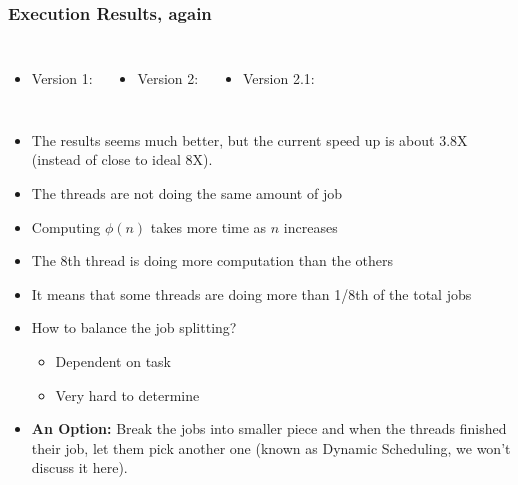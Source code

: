 \documentclass[aspectratio=43,11pt]{beamer}
\begin{document}
\begin{frame}
  \frametitle{Execution Results, again}

  \begin{columns}
  \begin{itemize}
    \item Version 1: \\
    \fontsize{8pt}{7.2}\selectfont{\tt real 0m38.191s \\
         user 0m38.180s \\
         sys  0m0.002s}  
  \end{itemize}
  \begin{itemize}
    \item Version 2: \\
    \fontsize{8pt}{7.2}\selectfont{\tt real 0m38.214s \\
         user 0m38.708s \\
         sys  0m0.075s}  
  \end{itemize}
  \begin{itemize}
    \item Version 2.1: \\
    \fontsize{8pt}{7.2}\selectfont{\tt real 0m9.975s \\
           user 0m41.427s \\
           sys  0m0.007s}
  \end{itemize}
  \end{columns}
  \vfill
  \begin{itemize}
    \item The results seems much better, but the current speed up is about 3.8X (instead of close to ideal 8X).
    \item The threads are not doing the same amount of job
    \item Computing $\phi(n)$ takes more time as $n$ increases
    \item The 8th thread is doing more computation than the others
    \item It means that some threads are doing more than 1/8th of the total jobs
    \item How to balance the job splitting?
    \begin{itemize}
      \item Dependent on task
      \item Very hard to determine
    \end{itemize}
    \item \textbf{An Option:} Break the jobs into smaller piece and when the threads finished
    their job, let them pick another one (known as Dynamic Scheduling, we won't discuss it here).
  \end{itemize}
\end{frame}
\end{document}
